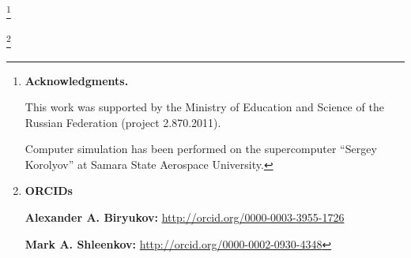 


\RuDate





\newpage



\makeentitle









\thanks{\textbf{Acknowledgments.} 

This work was supported by the Ministry of Education and Science of the Russian Federation (project  2.870.2011).



Computer simulation has been performed on the supercomputer ``Sergey Korolyov'' at Samara State Aerospace University.}



\thanks{{\bf ORCIDs}



{\bf Alexander A. Biryukov:} \url{http://orcid.org/0000-0003-3955-1726}



{\bf Mark A. Shleenkov:} \url{http://orcid.org/0000-0002-0930-4348}



}







\EngRef



